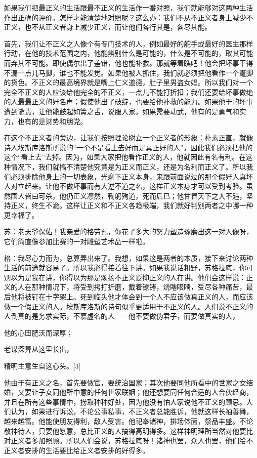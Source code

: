 \documentclass[12pt,oneside]{book}
\begin{document}
如果我们把最正义的生活跟最不正义的生活作一番对照，我们就能够对这两种生活作出正确的评价。怎样才能清楚地对照呢？这么办：我们不从不正义者身上减少不正义，也不从正义者身上减少正义，而让他们各行其是，各尽其能。

首先，我们让不正义之人像个有专门技术的人，例如最好的舵手或最好的医生那样行动，在他的技术范围之内，他能辨别什么是可能的，什么是不可能的，取其可能而弃其不可能。即使偶尔出了差错，他也能补救。那就等着瞧吧！他会把坏事干得不漏一点儿马脚，谁也不能发觉。如果他被人抓住，我们就必须把他看作一个蹩脚的货色。不正义的最高境界就是嘴上仁义道德，肚子里男盗女娼。所以我们对一个完全不正义的人应该给他完全的不正义，一点儿不能打折扣；我们还要给坏事做绝的人最最正义的好名声；假使他出了破绽，也要给他补救的能力。如果他干的坏事遭到谴责，让他能鼓起如簧之舌，说服人家。如果需要动武，他有的是勇气和实力，也有的是财势和朋党。

在这个不正义者的旁边，让我们按照理论树立一个正义者的形象：朴素正直，就像诗人埃斯库洛斯所说的“一个不是看上去好而是真正好的人”。因此我们必须把他的这个“看上去”去掉。因为，如果大家把他看作正义的人，他就因此有名有利。在这种情况下，我们就搞不清楚他究竟是为正义而正义，还是为名利而正义了。所以我们必须排除他身上的一切表象，光剩下正义本身，来跟前面说过的那个假好人真坏人对立起来。让他不做坏事而有大逆不道之名，这样正义本身才可以受到考验。虽然国人皆曰可杀，他仍正义凛然，鞠躬殉道，死而后已；他甘冒天下之大不韪，坚持正义，终生不渝。这样让正义和不正义各趋极端，我们就好判别两者之中哪一种更幸福了。

苏：老天爷保佑！我亲爱的格劳孔，你花了多大的努力塑造琢磨出这一对人像呀，它们简直像参加比赛的一对雕塑艺术品一样啦。

格：我尽心力而为，总算弄出来了。我想，如果这是两者的本质，接下来讨论两种生活的前途就容易了。所以我必得接着往下讲。如果我说话粗野，苏格拉底，你可别以为是我在讲，你得以为那是颂扬不正义贬抑正义的人在讲。他们会这样说：正义的人在那种情况下，将受到拷打折磨，戴着镣铐，烧瞎眼睛，受尽各种痛苦，最后他将被钉在十字架上。死到临头他才体会到一个人不应该做真正义的人，而应该做一个假正义的人。埃斯库洛斯的诗句似乎更适用于不正义的人。人们说不正义的人倒真的是务求实际，不慕虚名的人——他不要做伪君子，而要做真实的人，





他的心田肥沃而深厚；

老谋深算从这里长出，

精明主意生自这心头。[3]





他由于有正义之名，首先要做官，要统治国家；其次他要同他所看中的世家之女结婚，又要让子女同他所中意的任何世家联姻；他还想要同任何合适的人合伙经商，并且在所有这些事情中，捞取种种好处，因为他没有怕人家说他不正义的顾忌。人们认为，如果进行诉讼，不论公事私事，不正义者总能胜诉，他就这样长袖善舞，越来越富。他能使朋友得利，敌人受害。他祀奉诸神，排场体面，祭品丰盛。不论敬神待人，只要他愿意，总比正义的人搞得高明得多。这样神明理所当然对他要比对正义者多加照顾。所以人们会说，苏格拉底呀！诸神也罢，众人也罢，他们给不正义者安排的生活要比给正义者安排的好得多。
\end{document}
